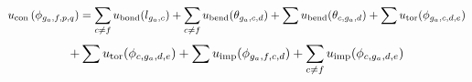 \documentclass[12pt]{article}
\begin{document}
\begin{displaymath}
u_{\rm con}\left(\phi_{g_a,f,p,q}\right) =
\sum_{c \neq f} u_{\rm bond}(l_{g_a,c})
+ \sum_{c \neq f} u_{\rm bend}(\theta_{g_a,c,d})
+ \sum u_{\rm bend}(\theta_{c,g_a,d})
+ \sum u_{\rm tor}(\phi_{g_a,c,d,e})
\end{displaymath}
\begin{displaymath}
+ \sum u_{\rm tor}(\phi_{c,g_a,d,e})
+ \sum u_{\rm imp}(\phi_{g_a,f,c,d})
+ \sum_{c \neq f} u_{\rm imp}(\phi_{c,g_a,d,e})
\end{displaymath}
\end{document}
